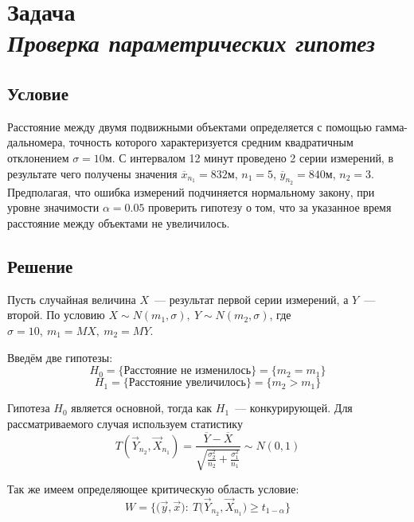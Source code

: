 \section*{Задача \\\textit{Проверка параметрических гипотез}}

\subsection*{Условие}
Расстояние между двумя подвижными объектами определяется с помощью гамма-дальномера, точность которого характеризуется средним квадратичным отклонением $\sigma = 10$м. С интервалом 12 минут проведено 2 серии измерений, в результате чего получены значения $\overline{x}_{n_1} = 832$м, $n_1 = 5$, $\overline{y}_{n_2} = 840$м, $n_2 = 3$. Предполагая, что ошибка измерений подчиняется нормальному закону, при уровне значимости $\alpha = 0.05$ проверить гипотезу о том, что за указанное время расстояние между объектами не увеличилось.

\subsection*{Решение}
Пусть случайная величина $X$~--- результат первой серии измерений, а $Y$~--- второй. По условию $X \sim N(m_1, \sigma),\ Y \sim N(m_2, \sigma)$, где $\sigma = 10,\ m_1 = MX,\ m_2 = MY$.

Введём две гипотезы:
\begin{equation*}
    H_0 = \big\{\text{Расстояние не изменилось}\big\} = \big\{m_2 = m_1\big\}
\end{equation*}
\begin{equation*}
    H_1 = \big\{\text{Расстояние увеличилось}\big\} = \big\{m_2 > m_1\big\}
\end{equation*}

Гипотеза $H_0$ является основной, тогда как $H_1$~--- конкурирующей. Для рассматриваемого случая используем статистику
\begin{equation*}
    T(\overrightarrow{Y}_{n_2}, \overrightarrow{X}_{n_1}) = \frac{\overline{Y} - \overline{X}}{\sqrt{\frac{\sigma_2^2}{n_2} + \frac{\sigma_1^2}{n_1}}} \sim N(0, 1)
\end{equation*}

Так же имеем определяющее критическую область условие:
\begin{equation*}
    W = \Big\{\big(\vec y, \vec x\big):\ T\big(\overrightarrow{Y}_{n_2}, \overrightarrow{X}_{n_1}\big) \geqslant t_{1 - \alpha}\Big\}
\end{equation*}

